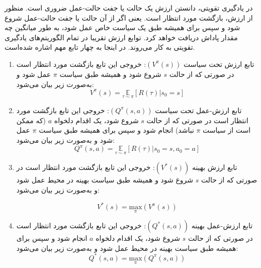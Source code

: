    در یادگیری تقویتی، دانستن ارزش
    یک حالت یا جفت حالت-عمل ضروری است. منظور از ارزش، بازگشت مورد انتظار
     است. یعنی اگر از آن حالت یا جفت حالت-عمل شروع شود و سپس برای همیشه طبق یک سیاست خاص عمل شود، به طور میانگین چه مقدار پاداش دریافت خواهد کرد. توابع ارزش تقریبا در تمام الگوریتم‌های یادگیری تقویتی به کار می‌روند.
   در اینجا به چهار تابع مهم اشاره شده‌است.
   \begin{enumerate}
   	
   	\item تابع ارزش تحت سیاست 
   	  $(V^{\pi}(s))$:
   	  خروجی این تابع بازگشت مورد انتظار است در صورتی که از حالت $s$ شروع شود و همیشه طبق سیاست $\pi$ عمل شود و به‌صورت زیر بیان می‌شود:
   	   \begin{equation}
   	   	V^{\pi}(s) = \underset{\tau \sim \pi}{\mathbb{E}}\left[R(\tau)|s_0 = s\right]
   	   \end{equation}
   	   
   	\item تابع ارزش-عمل تحت سیاست 
   	$(Q^{\pi}(s, a))$:
   	خروجی این تابع بازگشت مورد انتظار است در صورتی که از حالت $s$ شروع شود، یک اقدام دلخواه $a$ (که ممکن است از سیاست $\pi$ نباشد) انجام شود و سپس برای همیشه طبق سیاست $\pi$ عمل شود و به‌صورت زیر بیان می‌شود:
		\begin{equation}
		Q^{\pi}(s, a) = \underset{\tau \sim \pi}{\mathbb{E}}\left[R(\tau)|s_0 = s, a_0 = a\right]
		\end{equation}

 	
   	\item تابع ارزش بهینه
   	  $(V^*(s))$: 
   	 خروجی این تابع بازگشت مورد انتظار است در صورتی که از حالت $s$ شروع شود و همیشه طبق سیاست بهینه در محیط عمل شود و به‌صورت زیر بیان می‌شود:

	 \begin{equation}
	 V^*(s) = \underset{\pi}{\mathrm{max}} (V^{\pi}(s))
	 \end{equation}
   	
   	\item تابع ارزش-عمل بهینه
   	  $(Q^*(s, a))$:
   	خروجی این تابع بازگشت مورد انتظار است در صورتی که از حالت $s$ شروع شود، یک اقدام دلخواه $a$ انجام شود و سپس برای همیشه طبق سیاست بهینه در محیط عمل شود و به‌صورت زیر بیان می‌شود:
		\begin{equation}
		Q^*(s, a) = \underset{\pi}{\mathrm{max}} (Q^{\pi}(s, a))
		\end{equation}
   	
   \end{enumerate}
   
